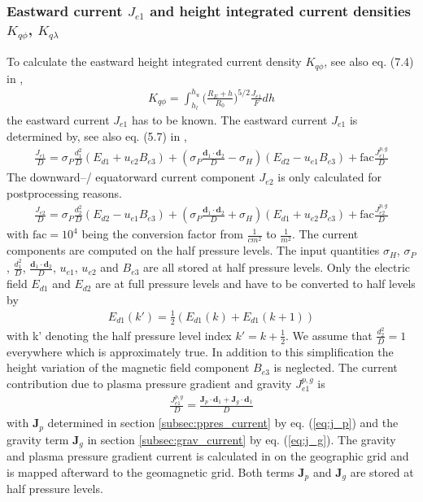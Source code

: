 %
\subsubsection{Eastward current $J_{e1}$ and height integrated current densities
 $K_{q\phi}$, $K_{q\lambda}$}
% 
To calculate the eastward height integrated current density $K_{q \phi}$, see also
eq. (7.4) in \cite{rich95},
%
\begin{align}
  K_{q \phi} = \int_{h_l}^{h_u} \bigl(\frac{R_E+h}{R_0}\bigr)^{5/2} \frac{J_{e1}}{F} dh
  \label{eq:kmphi_1}
\end{align}
% 
the eastward current $J_{e1}$ has to be known. The eastward current $J_{e1}$ is
determined by, see also
eq. (5.7) in \cite{rich95},
%
\begin{align}
  \frac{J_{e1}}{D} = \sigma_P \frac{d_1^2}{D}(E_{d1} + u_{e2}B_{e3}) + 
      (\sigma_P \frac{\mathbf{d}_1 \cdot \mathbf{d}_2}{D} - \sigma_H)
      (E_{d2} - u_{e1}B_{e3}) + \text{fac} \frac{J_{e1}^{p,g}}{D}
\end{align}
% 
The downward--/ equatorward current component $J_{e2}$ is only calculated for postprocessing
reasons.
%
\begin{align}
  \frac{J_{e2}}{D} = \sigma_P \frac{d_2^2}{D}(E_{d2} - u_{e1}B_{e3}) + 
      (\sigma_P \frac{\mathbf{d}_1 \cdot \mathbf{d}_2}{D} + \sigma_H)
      (E_{d1} + u_{e2}B_{e3}) + \text{fac} \frac{J_{e2}^{p,g}}{D}
\end{align}
%
with $\text{fac}=10^4$ being the conversion factor from $\frac{1}{cm^2}$ to $\frac{1}{m^2}$. 
The current components are computed on the half pressure levels. The input
quantities $\sigma_H$, $\sigma_P$, $\frac{d_1^2}{D}$, 
$\frac{\mathbf{d}_1 \cdot \mathbf{d}_2}{D}$, $u_{e1}$, $u_{e2}$ and $B_{e3}$ are
all stored at half pressure levels. Only the electric field $E_{d1}$ and $E_{d2}$
are at full pressure levels and have to be converted to half levels by
%
\begin{align}
   E_{d1}(k') = \frac{1}{2} (E_{d1}(k) + E_{d1}(k+1) )
\end{align}
% 
with k' denoting the half pressure level index $k' = k+ \frac{1}{2}$. We assume that
$\frac{d_2^2}{D} =1$ everywhere which is approximately true. In addition to this
simplification the height variation of the magnetic field component $B_{e3}$
is neglected. The current contribution due to plasma pressure gradient and gravity 
$J_{e1}^{p,g}$ is
%
\begin{align}
  \frac{J_{e1}^{p,g}}{D} = \frac{\mathbf{J}_{p}\cdot \mathbf{d}_1 + 
          \mathbf{J}_{g}\cdot \mathbf{d}_1}{D}  
\end{align}
% 
with $\mathbf{J}_{p}$ determined in section \ref{subsec:ppres_current}  by
eq. (\ref{eq:j_p}) and the gravity term  $\mathbf{J}_{g}$ in section 
\ref{subsec:grav_current} by eq. (\ref{eq:j_g}). The gravity and plasma pressure 
gradient current is calculated in  on the
geographic grid and is mapped afterward to the geomagnetic grid. Both terms $\mathbf{J}_{p}$
 and $\mathbf{J}_{g}$ are stored at half pressure levels. \\
 
